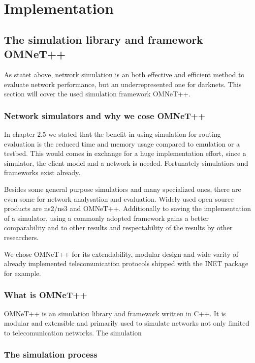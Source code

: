 \chapter{Implementation}

\section{The simulation library and framework OMNeT++}

As statet above, network simulation is an both effective and efficient method to evaluate network performance, but an underrepresented one for darknets. This section will cover the used simulation framework OMNeT++.

\subsection{Network simulators and why we cose OMNeT++}

In chapter 2.5 we stated that the benefit in using simulation for routing evaluation is the reduced time and memory usage compared to emulation or a testbed. This would comes in exchange for a huge implementation effort, since a simulator, the client model and a network is needed. Fortunately simulatiors and frameworks exist already.

Besides some general purpose simulatiors and many specialized ones, there are even some for network analysation and evaluation. Widely used open source products are ns2/ns3 and OMNeT++. Additionally to saving the implementation of a simulator, using a commonly adopted framework gains a better comparability and to other results and respectability of the results by other researchers.

We chose OMNeT++ for its extendability, modular design and wide varity of already implemented telecomunication protocols shipped with the INET package for example.

\subsection{What is OMNeT++}

OMNeT++ is an simulation library and framework written in C++. It is modular and extensible and primarily used to simulate networks not only limited to telecomunication networks. The simulation 

\subsection{The simulation process}

